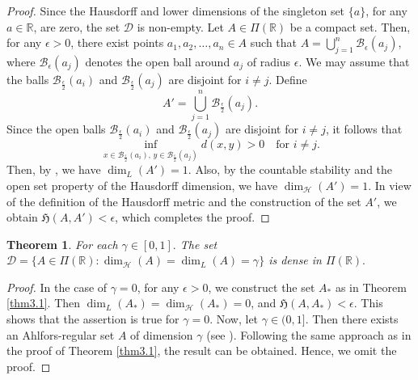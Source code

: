 \documentclass{amsproc}
\newtheorem{theorem}{Theorem}[section]
\theoremstyle{definition}
\theoremstyle{remark}
\numberwithin{equation}{section}
\begin{document}
\begin{proof}
    Since the Hausdorff and lower dimensions of the singleton set $\{a\}$, for any $a \in \mathbb{R}$, are zero, the set $\mathcal{D}$ is non-empty. Let $A \in \Pi(\mathbb{R})$ be a compact set. Then, for any $\epsilon > 0$, there exist points $a_1, a_2, \ldots, a_n \in A$ such that $A = \bigcup_{j=1}^n \mathcal{B}_{\epsilon}(a_j)$,
  where $\mathcal{B}_{\epsilon}(a_j)$ denotes the open ball around $a_j$ of radius $\epsilon$. We may assume that the balls $\mathcal{B}_{\frac{\epsilon}{2}}(a_i)$ and $\mathcal{B}_{\frac{\epsilon}{2}}(a_j)$ are disjoint for $i \neq j$. Define  
\[
A' = \bigcup_{j=1}^n \mathcal{B}_{\tfrac{\epsilon}{2}}(a_j).
\]  
Since the open balls $\mathcal{B}_{\frac{\epsilon}{2}}(a_i)$ and $\mathcal{B}_{\frac{\epsilon}{2}}(a_j)$ are disjoint for $i \neq j$, it follows that  
\[
\inf_{x \in \mathcal{B}_{\tfrac{\epsilon}{2}}(a_i), \, y \in \mathcal{B}_{\tfrac{\epsilon}{2}}(a_j)} d(x, y) > 0 \quad \text{for } i \neq j.
\]  
Then, by \cite[Lemma 3.4.9]{Fraser}, we have $\dim_L(A') = 1$. Also, by the countable stability and the open set property of the Hausdorff dimension, we have $\dim_\mathcal{H} (A') = 1$. In view of the definition of the Hausdorff metric and the construction of the set $A'$, we obtain $\mathfrak{H}(A, A') < \epsilon$, which completes the proof.
\end{proof}

\begin{theorem}
    For each $\gamma \in [0,1].$ The set $\mathcal{D}=\{A\in\Pi(\mathbb{R}):\dim_\mathcal{H}(A) = \dim_L(A)= \gamma\}$ is dense in $\Pi(\mathbb{R}).$ 
\end{theorem}
\begin{proof}
In the case of \( \gamma = 0 \), for any \( \epsilon > 0 \), we construct the set \( A_* \) as in Theorem \ref{thm3.1}. Then \( \dim_L(A_*) = \dim_\mathcal{H}(A_*) = 0 \), and \( \mathfrak{H}(A, A_*) < \epsilon \). This shows that the assertion is true for \( \gamma = 0 \).
Now, let \( \gamma \in (0,1] \). Then there exists an Ahlfors-regular set \( A \) of dimension \( \gamma \) (see \cite{Arc}). Following the same approach as in the proof of Theorem \ref{thm3.1}, the result can be obtained. Hence, we omit the proof.


\end{proof}
\end{document}
